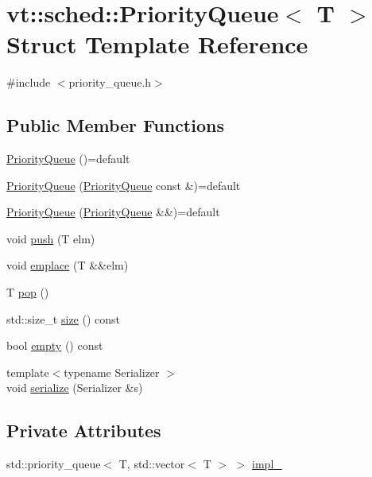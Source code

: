 \hypertarget{structvt_1_1sched_1_1_priority_queue}{}\section{vt\+:\+:sched\+:\+:Priority\+Queue$<$ T $>$ Struct Template Reference}
\label{structvt_1_1sched_1_1_priority_queue}


{\ttfamily \#include $<$priority\+\_\+queue.\+h$>$}

\subsection*{Public Member Functions}
\begin{DoxyCompactItemize}
\item 
\hyperlink{structvt_1_1sched_1_1_priority_queue_a03986418bd682344f22d1e0a5d4a3e3a}{Priority\+Queue} ()=default
\item 
\hyperlink{structvt_1_1sched_1_1_priority_queue_aca0fe178fbd601fa22816c2d895d5435}{Priority\+Queue} (\hyperlink{structvt_1_1sched_1_1_priority_queue}{Priority\+Queue} const \&)=default
\item 
\hyperlink{structvt_1_1sched_1_1_priority_queue_a25eedffc3b4665d0c1bb27027803e571}{Priority\+Queue} (\hyperlink{structvt_1_1sched_1_1_priority_queue}{Priority\+Queue} \&\&)=default
\item 
void \hyperlink{structvt_1_1sched_1_1_priority_queue_af532279184e76da6c72a52664d6a9922}{push} (T elm)
\item 
void \hyperlink{structvt_1_1sched_1_1_priority_queue_a152f4592447d7c478fe6aa0f8fbd5173}{emplace} (T \&\&elm)
\item 
T \hyperlink{structvt_1_1sched_1_1_priority_queue_aec357e1233dcb2991105795640372f8a}{pop} ()
\item 
std\+::size\+\_\+t \hyperlink{structvt_1_1sched_1_1_priority_queue_a017313382884e652da648d274a09b80d}{size} () const
\item 
bool \hyperlink{structvt_1_1sched_1_1_priority_queue_aaee204c658c333cd9bb30615bcb35e07}{empty} () const
\item 
{\footnotesize template$<$typename Serializer $>$ }\\void \hyperlink{structvt_1_1sched_1_1_priority_queue_a8003054ebf860d24a7825783f90941d9}{serialize} (Serializer \&s)
\end{DoxyCompactItemize}
\subsection*{Private Attributes}
\begin{DoxyCompactItemize}
\item 
std\+::priority\+\_\+queue$<$ T, std\+::vector$<$ T $>$ $>$ \hyperlink{structvt_1_1sched_1_1_priority_queue_a7b4a0abb373f4810e869bfc11303f487}{impl\+\_\+}
\end{DoxyCompactItemize}


